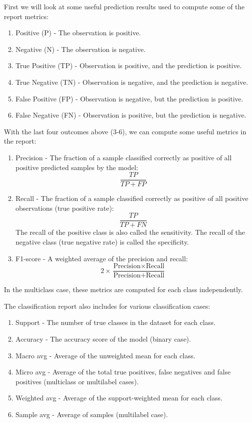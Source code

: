 \documentclass[a4paper, american, 12pt]{report}
\begin{document}
	First we will look at some useful prediction results used to compute some of the report metrics:
	\begin{enumerate}
		\item Positive (P) - The observation is positive.
		\item Negative (N) - The observation is negative.
		\item True Positive (TP) - Observation is positive, and the prediction is positive.
		\item True Negative (TN) - Observation is negative, and the prediction is negative.
		\item False Positive (FP) - Observation is negative, but the prediction is positive.
		\item False Negative (FN) - Observation is positive, but the prediction is negative.
	\end{enumerate}
	With the last four outcomes above (3-6), we can compute some useful metrics in the report:
	\begin{enumerate}
		\item[] Precision - The fraction of a sample classified correctly as positive of all positive predicted samples by the model:
		\[\frac{TP}{TP+FP}\]
		\item[] Recall - The fraction of a sample classified correctly as positive of all positive observations (true positive rate):
		\[\frac{TP}{TP+FN}\]
		The recall of the positive class is also called the sensitivity. The recall of the negative class (true negative rate) is called the specificity.
		\item[] F1-score - A weighted average of the precision and recall:
		\[2\times\frac{\text{Precision}\times \text{Recall}}{\text{Precision}+ \text{Recall}}\]
	\end{enumerate}
	In the multiclass case, these metrics are computed for each class independently. 
	
	The classification report also includes for various classification cases:
	\begin{enumerate}
		\item[] Support - The number of true classes in the dataset for each class.
		\item[] Accuracy - The accuracy score of the model (binary case).
		\item[] Macro avg - Average of the unweighted mean for each class.
		\item[] Micro avg - Average of the total true positives, false negatives and false positives (multiclass or multilabel cases).
		\item[] Weighted avg - Average of the support-weighted mean for each class.
		\item[] Sample avg - Average of samples (multilabel case).
	\end{enumerate}
	
\end{document}
